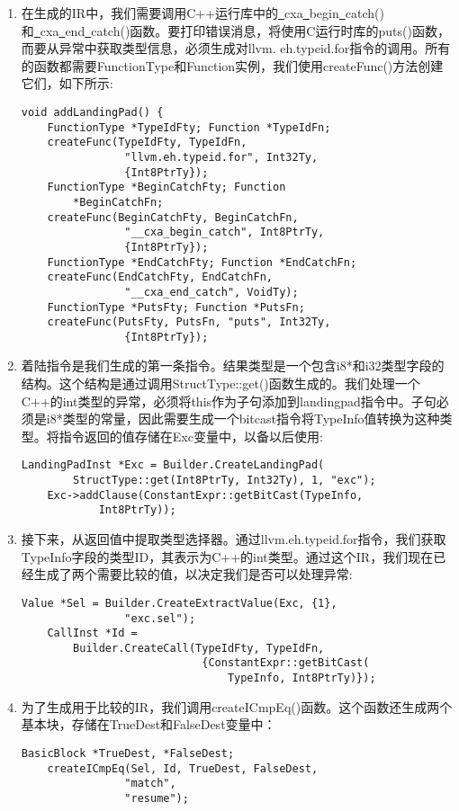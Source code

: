 \begin{enumerate}
\item 在生成的IR中，我们需要调用C++运行库中的\underline{~}cxa\underline{~}begin\underline{~}catch()和\underline{~}cxa\underline{~}end\underline{~}catch()函数。要打印错误消息，将使用C运行时库的puts()函数，而要从异常中获取类型信息，必须生成对llvm. eh.typeid.for指令的调用。所有的函数都需要FunctionType和Function实例，我们使用createFunc()方法创建它们，如下所示:
\begin{lstlisting}[caption={}]
void addLandingPad() {
	FunctionType *TypeIdFty; Function *TypeIdFn;
	createFunc(TypeIdFty, TypeIdFn,
				"llvm.eh.typeid.for", Int32Ty,
				{Int8PtrTy});
	FunctionType *BeginCatchFty; Function 
		*BeginCatchFn;
	createFunc(BeginCatchFty, BeginCatchFn,
				"__cxa_begin_catch", Int8PtrTy,
				{Int8PtrTy});
	FunctionType *EndCatchFty; Function *EndCatchFn;
	createFunc(EndCatchFty, EndCatchFn,
				"__cxa_end_catch", VoidTy);
	FunctionType *PutsFty; Function *PutsFn;
	createFunc(PutsFty, PutsFn, "puts", Int32Ty,
				{Int8PtrTy});
\end{lstlisting}

\item 着陆指令是我们生成的第一条指令。结果类型是一个包含i8*和i32类型字段的结构。这个结构是通过调用StructType::get()函数生成的。我们处理一个C++的int类型的异常，必须将this作为子句添加到landingpad指令中。子句必须是i8*类型的常量，因此需要生成一个bitcast指令将TypeInfo值转换为这种类型。将指令返回的值存储在Exc变量中，以备以后使用:
\begin{lstlisting}[caption={}]
	LandingPadInst *Exc = Builder.CreateLandingPad(
		StructType::get(Int8PtrTy, Int32Ty), 1, "exc");
	Exc->addClause(ConstantExpr::getBitCast(TypeInfo, 
			Int8PtrTy));
\end{lstlisting}

\item 接下来，从返回值中提取类型选择器。通过llvm.eh.typeid.for指令，我们获取TypeInfo字段的类型ID，其表示为C++的int类型。通过这个IR，我们现在已经生成了两个需要比较的值，以决定我们是否可以处理异常:
\begin{lstlisting}[caption={}]
	Value *Sel = Builder.CreateExtractValue(Exc, {1}, 
				"exc.sel");
	CallInst *Id =
		Builder.CreateCall(TypeIdFty, TypeIdFn,
							{ConstantExpr::getBitCast(
								TypeInfo, Int8PtrTy)});
\end{lstlisting}

\item 为了生成用于比较的IR，我们调用createICmpEq()函数。这个函数还生成两个基本块，存储在TrueDest和FalseDest变量中：
\begin{lstlisting}[caption={}]
	BasicBlock *TrueDest, *FalseDest;
	createICmpEq(Sel, Id, TrueDest, FalseDest, 
				"match",
				"resume");
\end{lstlisting}


\end{enumerate}
